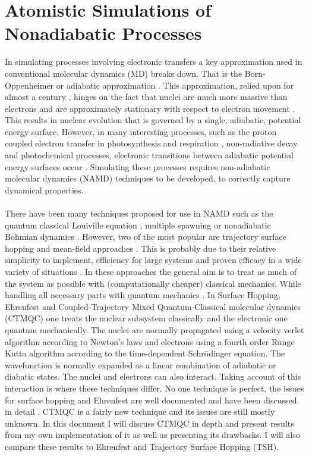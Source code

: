 \section{Atomistic Simulations of Nonadiabatic Processes}
In simulating processes involving electronic transfers a key approximation used in conventional molecular dynamics (MD) breaks down. That is the Born-Oppenheimer or adiabatic approximation \cite{john_c._tully_nonadiabatic_nodate}. This approximation, relied upon for almost a century \cite{Pisana2007Feb}, hinges on the fact that nuclei are much more massive than electrons and are approximately stationary with respect to electron movement \cite{Born1927Jan}. This results in nuclear evolution that is governed by a single, adiabatic, potential energy surface. However, in many interesting processes, such as the proton coupled electron transfer in photosynthesis and respiration
 \cite{Hammes-Schiffer2001Apr, Hammes-Schiffer1994Sep, Huynh2007}, non-radiative decay and photochemical processes, electronic transitions between adiabatic potential energy surfaces occur \cite{tully_nonadiabatic_1991}. Simulating these processes requires non-adiabatic molecular dynamics (NAMD) techniques to be developed, to correctly capture dynamical properties.
\\\\
There have been many techniques proposed for use in NAMD such as the quantum classical Louiville equation \cite{Kapral1999May}, multiple spawning \cite{Martnnez*2005Oct} or nonadiabatic Bohmian dynamics \cite{Albareda2014Aug}. However, two of the most popular are trajectory surface hopping \cite{Tully1990Jul} and mean-field approaches \cite{Whetten85}. This is probably due to their relative simplicity to implement, efficiency for large systems and proven efficacy in a wide variety of situations
\cite{Shenvi2011Apr}. In these approaches the general aim is to treat as much of the system as possible with (computationally cheaper) classical mechanics. While handling all necessary parts with quantum mechanics \cite{Coker1995Jan}. In Surface Hopping, Ehrenfest and Coupled-Trajectory Mixed Quantum-Classical molecular dynamics (CTMQC) one treats the nuclear subsystem classically and the electronic one quantum mechanically. The nuclei are normally propagated using a velocity verlet algorithm according to Newton's laws and electrons using a fourth order Runge Kutta algorithm according to the time-dependent Schr\"odinger equation. The wavefunction is normally expanded as a linear combination of adiabatic or diabatic states. The nuclei and electrons can also interact. Taking account of this interaction is where these techniques differ. No one technique is perfect, the issues for surface hopping and Ehrenfest are well documented and have been discussed in detail \cite{SubotnikReview2016, Giovanni_2010_deco, Jaeger_2012_deco, Jain2016, Subotnik_2011_deco}. CTMQC is a fairly new technique and its issues are still mostly unknown. In this document I will discuss CTMQC in depth and present results from my own implementation of it as well as presenting its drawbacks. I will also compare these results to Ehrenfest and Trajectory Surface Hopping (TSH).

